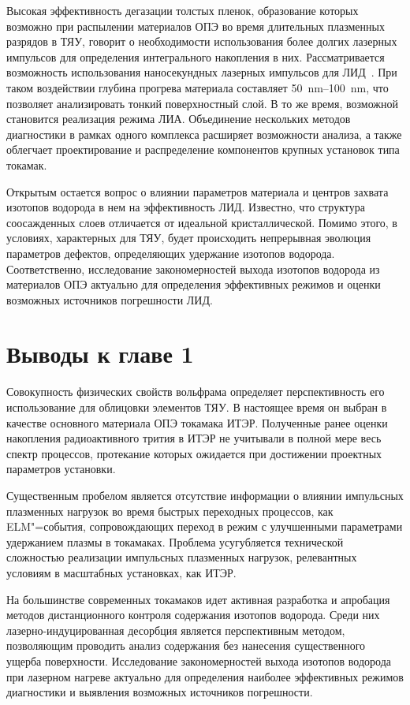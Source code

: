 Высокая эффективность дегазации толстых пленок, образование которых возможно при распылении материалов ОПЭ во время длительных плазменных разрядов в ТЯУ, говорит о необходимости использования более долгих лазерных импульсов для определения интегрального накопления в них. Рассматривается возможность использования наносекундных лазерных импульсов для ЛИД~\cite{Medvedev2024, Gasparyan2021, Efimov2024}. При таком воздействии глубина прогрева материала составляет \SIrange{50}{100}{\nano\meter}, что позволяет анализировать тонкий поверхностный слой. В то же время, возможной становится реализация режима ЛИА. Объединение нескольких методов диагностики в рамках одного комплекса расширяет возможности анализа, а также облегчает проектирование и распределение компонентов крупных установок типа токамак.

Открытым остается вопрос о влиянии параметров материала и центров захвата изотопов водорода в нем на эффективность ЛИД. Известно, что структура соосажденных слоев отличается от идеальной кристаллической. Помимо этого, в условиях, характерных для ТЯУ, будет происходить непрерывная эволюция параметров дефектов, определяющих удержание изотопов водорода. Соответственно, исследование закономерностей выхода изотопов водорода из материалов ОПЭ актуально для определения эффективных режимов и оценки возможных источников погрешности ЛИД. 

\section{Выводы к главе 1}

Совокупность физических свойств вольфрама определяет перспективность его использование для облицовки элементов ТЯУ. В настоящее время он выбран в качестве основного материала ОПЭ токамака ИТЭР. Полученные ранее оценки накопления радиоактивного трития в ИТЭР не учитывали в полной мере весь спектр процессов, протекание которых ожидается при достижении проектных параметров установки. 

Существенным пробелом является отсутствие информации о влиянии импульсных плазменных нагрузок во время быстрых переходных процессов, как ELM"=события, сопровождающих переход в режим с улучшенными параметрами удержанием плазмы в токамаках. Проблема усугубляется технической сложностью реализации импульсных плазменных нагрузок, релевантных условиям в масштабных установках, как ИТЭР. 

На большинстве современных токамаков идет активная разработка и апробация методов дистанционного контроля содержания изотопов водорода. Среди них лазерно-индуцированная десорбция является перспективным методом, позволяющим проводить анализ содержания без нанесения существенного ущерба поверхности. Исследование закономерностей выхода изотопов водорода при лазерном нагреве актуально для определения наиболее эффективных режимов диагностики и выявления возможных источников погрешности.

\FloatBarrier
